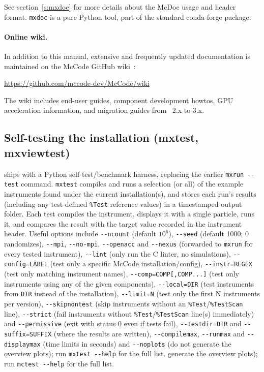 See section~\ref{s:mxdoc} for more details about the McDoc usage and header
format.  \verb+mxdoc+ is a pure Python tool, part of the standard \MCX
conda-forge package.

\paragraph{Online wiki.}
In addition to this manual, extensive and frequently updated documentation
is maintained on the McCode GitHub wiki~\cite{Wiki}:
\begin{center}
  \url{https://github.com/mccode-dev/McCode/wiki}
\end{center}
The wiki includes end-user guides, component development howtos, GPU
acceleration information, and migration guides from \MCX~2.x to 3.x.


\subsection{Self-testing the installation (mxtest, mxviewtest)}
\label{s:mxtest}

\MCX ships with a Python self-test/benchmark harness, replacing the earlier
\verb+mxrun --test+ command. \verb+mxtest+ compiles and runs a selection (or
all) of the example instruments found under the current installation(s), and
stores each run's results (including any test-defined \texttt{\%Test}
reference values) in a timestamped output folder. Each test compiles the
instrument, displays it with a single particle, runs it, and compares the
result with the target value recorded in the instrument header. Useful options
include \verb+--ncount+ (default $10^6$), \verb+--seed+ (default 1000; 0
randomizes), \verb+--mpi+, \verb+--no-mpi+, \verb+--openacc+ and \verb+--nexus+
(forwarded to \verb+mxrun+ for every tested instrument), \verb+--lint+ (only
run the C linter, no simulations), \verb+--config=LABEL+ (test only a specific
McCode installation/config), \verb+--instr=REGEX+ (test only matching
instrument names), \verb+--comp=COMP[,COMP...]+ (test only instruments using
any of the given components), \verb+--local=DIR+ (test instruments from
\texttt{DIR} instead of the installation), \verb+--limit=N+ (test only the first
N instruments per version), \verb+--skipnontest+ (skip instruments without an
\texttt{\%Test}/\texttt{\%TestScan} line), \verb+--strict+ (fail instruments without
\texttt{\%Test}/\texttt{\%TestScan} line(s) immediately) and \verb+--permissive+ (exit with
status 0 even if tests fail), \verb+--testdir=DIR+ and \verb+--suffix=SUFFIX+
(where the results are written), \verb+--compilemax+, \verb+--runmax+ and
\verb+--displaymax+ (time limits in seconds) and \verb+--noplots+ (do not
generate the overview plots); run \verb+mxtest --help+ for the full list.
generate the overview plots); run \verb+mctest --help+ for the full list.


